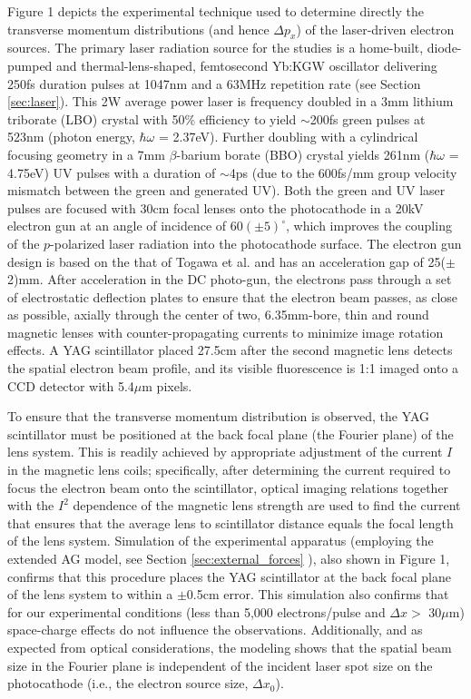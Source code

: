 \begin{figure}
  \centering
  
\end{figure}

Figure 1 depicts the experimental technique used to determine directly the transverse momentum distributions (and hence $\Delta p_x$) of the laser-driven electron sources.
The primary laser radiation source for the studies is a home-built, diode-pumped and thermal-lens-shaped, femtosecond Yb:KGW oscillator\cite{berger_high-power_2008} delivering 250fs duration pulses at 1047nm and a 63MHz repetition rate (see Section \ref{sec:laser}).
This 2W average power laser is frequency doubled in a 3mm lithium triborate (LBO) crystal with 50\% efficiency to yield $\sim$200fs green pulses at 523nm (photon energy, $\hbar \omega$ = 2.37eV).
Further doubling with a cylindrical focusing geometry in a 7mm $\beta$-barium borate (BBO) crystal yields 261nm ($\hbar \omega$ = 4.75eV) UV pulses with a duration of $\sim$4ps (due to the 600fs/mm group velocity mismatch between the green and generated UV).
Both the green and UV laser pulses are focused with 30cm focal lenses onto the photocathode in a 20kV electron gun at an angle of incidence of $60(\pm5)^{\circ}$, which improves the coupling of the $p$-polarized laser radiation into the photocathode surface\cite{berger_dc_2009}.
The electron gun design is based on the that of Togawa et al.\cite{berger_dc_2009,togawa_ceb6_2007} and has an acceleration gap of 25($\pm$2)mm.
After acceleration in the DC photo-gun, the electrons pass through a set of electrostatic deflection plates to ensure that the electron beam passes, as close as possible, axially through the center of two, 6.35mm-bore, thin and round magnetic lenses with counter-propagating currents to minimize image rotation effects.
A YAG scintillator placed 27.5cm after the second magnetic lens detects the spatial electron beam profile, and its visible fluorescence is 1:1 imaged onto a CCD detector with 5.4$\mu$m pixels. 

To ensure that the transverse momentum distribution is observed, the YAG scintillator must be positioned at the back focal plane (the Fourier plane) of the lens system.
This is readily achieved by appropriate adjustment of the current $I$ in the magnetic lens coils; specifically, after determining the current required to focus the electron beam onto the scintillator, optical imaging relations together with the $I^2$ dependence of the magnetic lens strength are used to find the current that ensures that the average lens to scintillator distance equals the focal length of the lens system.
Simulation of the experimental apparatus (employing the extended AG model, see Section \ref{sec:external_forces} ), also shown in Figure 1, confirms that this procedure places the YAG scintillator at the back focal plane of the lens system to within a $\pm$0.5cm error.
This simulation also confirms that for our experimental conditions (less than 5,000 electrons/pulse and $\Delta x > $ 30$\mu$m) space-charge effects do not influence the observations.
Additionally, and as expected from optical considerations, the modeling shows that the spatial beam size in the Fourier plane is independent of the incident laser spot size on the photocathode (i.e., the electron source size, $\Delta x_0$). 

